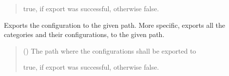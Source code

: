 \documentclass[letterpaper,10pt,english]{sphinxmanual}
\begin{document}
\begin{fulllineitems}
\begin{fulllineitems}
\begin{quote}
\begin{description}
\sphinxAtStartPar
true, if export was successful, otherwise false.

\sphinxAtStartPar
{}

\end{description}\end{quote}

\end{fulllineitems}


\begin{fulllineitems}
\label{\detokenize{apidoc/src.osm_configurator.model.project:src.osm_configurator.model.project.export.Export.export_configuration}}
\pysigstartsignatures
{}
\pysigstopsignatures
\sphinxAtStartPar
Exports the configuration to the given path. More specific, exports all the categories and their configurations,
to the given path.
\begin{quote}\begin{description}
\sphinxAtStartPar
{} () \textendash{} The path where the configurations shall be exported to

\sphinxAtStartPar
true, if export was successful, otherwise false.

\sphinxAtStartPar
{}

\end{description}\end{quote}

\end{fulllineitems}



\end{fulllineitems}
\end{document}
